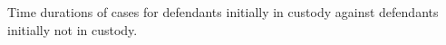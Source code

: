 Time durations of cases for defendants initially in custody against defendants initially not in custody.
\label{fig:ViolinsCustody}